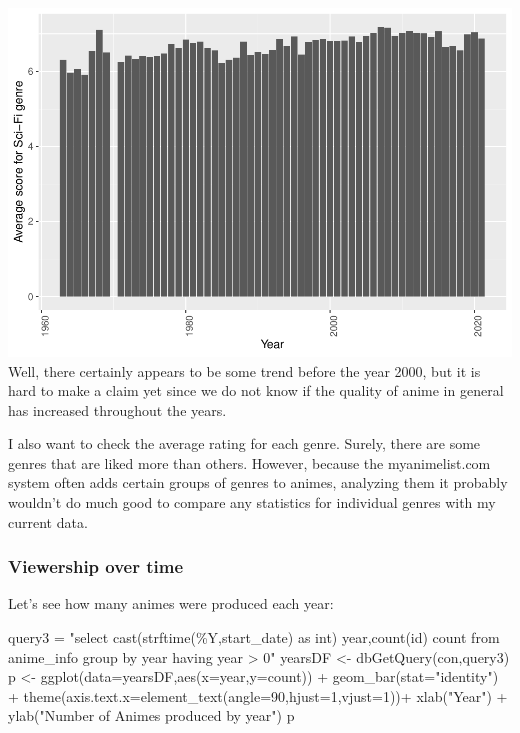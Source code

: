 \documentclass[
]{article}
\newenvironment{Shaded}{\begin{snugshade}}{\end{snugshade}}
\newcommand{\AttributeTok}[1]{\textcolor[rgb]{0.77,0.63,0.00}{#1}}
\newcommand{\DecValTok}[1]{\textcolor[rgb]{0.00,0.00,0.81}{#1}}
\newcommand{\FunctionTok}[1]{\textcolor[rgb]{0.00,0.00,0.00}{#1}}
\newcommand{\NormalTok}[1]{#1}
\newcommand{\OtherTok}[1]{\textcolor[rgb]{0.56,0.35,0.01}{#1}}
\newcommand{\SpecialCharTok}[1]{\textcolor[rgb]{0.00,0.00,0.00}{#1}}
\newcommand{\StringTok}[1]{\textcolor[rgb]{0.31,0.60,0.02}{#1}}
\begin{document}
\includegraphics{R_analysis_files/figure-latex/unnamed-chunk-7-1.pdf}
Well, there certainly appears to be some trend before the year 2000, but
it is hard to make a claim yet since we do not know if the quality of
anime in general has increased throughout the years.

I also want to check the average rating for each genre. Surely, there
are some genres that are liked more than others. However, because the
myanimelist.com system often adds certain groups of genres to animes,
analyzing them it probably wouldn't do much good to compare any
statistics for individual genres with my current data.

\hypertarget{viewership-over-time}{%
\subsubsection{Viewership over time}\label{viewership-over-time}}

Let's see how many animes were produced each year:

\begin{Shaded}
\begin{Highlighting}[]
\NormalTok{query3 }\OtherTok{=} \StringTok{"select cast(strftime(\textquotesingle{}\%Y\textquotesingle{},start\_date) as int) year,count(id) count from anime\_info group by year having year \textgreater{} 0"}
\NormalTok{yearsDF }\OtherTok{\textless{}{-}} \FunctionTok{dbGetQuery}\NormalTok{(con,query3)}
\NormalTok{p }\OtherTok{\textless{}{-}} \FunctionTok{ggplot}\NormalTok{(}\AttributeTok{data=}\NormalTok{yearsDF,}\FunctionTok{aes}\NormalTok{(}\AttributeTok{x=}\NormalTok{year,}\AttributeTok{y=}\NormalTok{count)) }\SpecialCharTok{+}
  \FunctionTok{geom\_bar}\NormalTok{(}\AttributeTok{stat=}\StringTok{"identity"}\NormalTok{) }\SpecialCharTok{+}
  \FunctionTok{theme}\NormalTok{(}\AttributeTok{axis.text.x=}\FunctionTok{element\_text}\NormalTok{(}\AttributeTok{angle=}\DecValTok{90}\NormalTok{,}\AttributeTok{hjust=}\DecValTok{1}\NormalTok{,}\AttributeTok{vjust=}\DecValTok{1}\NormalTok{))}\SpecialCharTok{+}
  \FunctionTok{xlab}\NormalTok{(}\StringTok{"Year"}\NormalTok{) }\SpecialCharTok{+} \FunctionTok{ylab}\NormalTok{(}\StringTok{"Number of Animes produced by year"}\NormalTok{)}
\NormalTok{p}
\end{Highlighting}
\end{Shaded}
\end{document}
